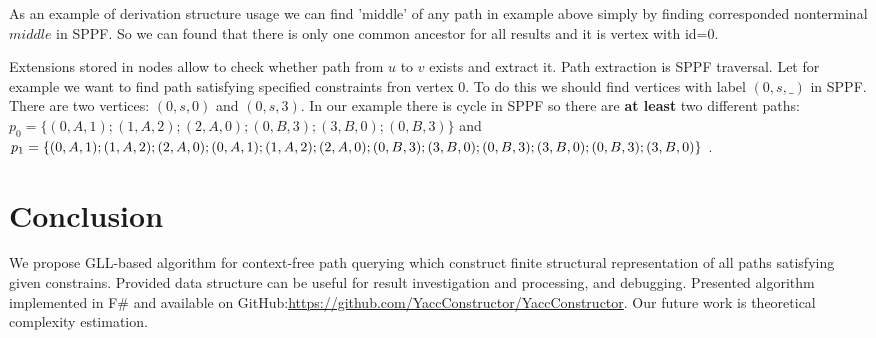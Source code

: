 \documentclass{sig-alternate} %
\begin{document}
As an example of derivation structure usage we can find 'middle' of any path in example above simply by finding corresponded nonterminal $middle$ in SPPF.
So we can found that there is only one common ancestor for all results and it is vertex with id=$0$. 

Extensions stored in nodes allow to check whether path from $u$ to $v$ exists and extract it. 
Path extraction is SPPF traversal. 
Let for example we want to find path satisfying specified constraints fron vertex $0$.
To do this we should find vertices with label $(0, s, \_)$ in SPPF. There are two vertices: $(0, s, 0)$ and $(0, s , 3)$.
In our example there is cycle in SPPF so there are \textbf{at least} two different paths: $p_0=\{(0,A,1);(1,A,2);(2,A,0);(0,B,3);(3,B,0);(0,B,3)\}$ and $p_1=\{(0,A,1);(1,A,2);(2,A,0);(0,A,1);(1,A,2);(2,A,0);\\ (0,B,3);(3,B,0);(0,B,3);(3,B,0);(0,B,3);(3,B,0)\}$ .

\section{Conclusion}
We propose GLL-based algorithm for context-free path querying which construct finite structural representation of all paths satisfying given constrains.
Provided data structure can be useful for result investigation and processing, and debugging.
Presented algorithm implemented in F\# and available on GitHub:\url{https://github.com/YaccConstructor/YaccConstructor}.
Our future work is theoretical complexity estimation. 






\end{document}
